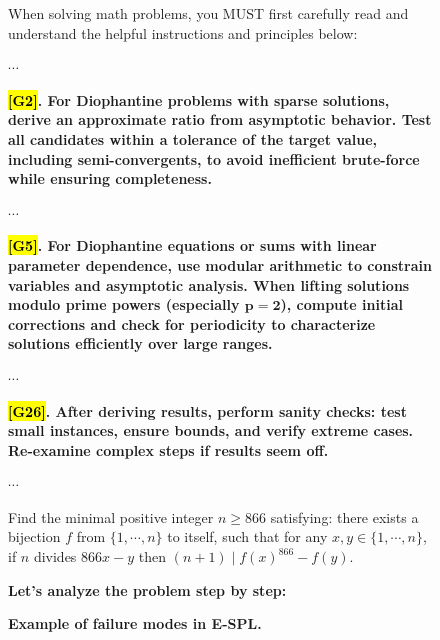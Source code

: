 \documentclass{article}
\theoremstyle{plain}
\theoremstyle{definition}
\theoremstyle{remark}
\begin{document}
\begin{figure}[!tb]
\centering
\caption{\textbf{Example of {\color{red}failure modes} in E-SPL.}}

\begin{runcard}[title={Example of How E-SPL Shapes Model Behavior}]

\medskip

\begin{runbox}[title={\textbf{Learned System Prompt}}]
When solving math problems, you MUST first carefully read and understand the helpful instructions and principles below:

$\cdots$

\textbf{\color{Brown}\hl{{[G2]}}. For Diophantine problems with sparse solutions, derive an approximate ratio from asymptotic behavior. Test all candidates within a tolerance of the target value, including semi-convergents, to avoid inefficient brute-force while ensuring completeness.}

$\cdots$

\textbf{\color{Brown}\hl{{[G5]}}. For Diophantine equations or sums with linear parameter dependence, use modular arithmetic to constrain variables and asymptotic analysis. When lifting solutions modulo prime powers (especially $\boldsymbol{p=2}$), compute initial corrections and check for periodicity to characterize solutions efficiently over large ranges.}

$\cdots$

\textbf{\color{Brown}\hl{{[G26]}}. After deriving results, perform sanity checks: test small instances, ensure bounds, and verify extreme cases. Re-examine complex steps if results seem off.}

$\cdots$

\end{runbox}

\begin{runbox}[title={Problem}]
Find the minimal positive integer \(n \geqslant 866\) satisfying: there exists a bijection \(f\) from \(\{1,\cdots,n\}\) to itself, such that for any \(x,y\in\{1,\cdots,n\}\), if \(n\) divides \(866x - y\) then \((n + 1)\mid f(x)^{866} - f(y)\).

\end{runbox}

\begin{runbox}[title={Model Output}]

\textbf{Let's analyze the problem step by step:}

\medskip


\end{runbox}
\end{runcard}
\end{figure}
\end{document}
